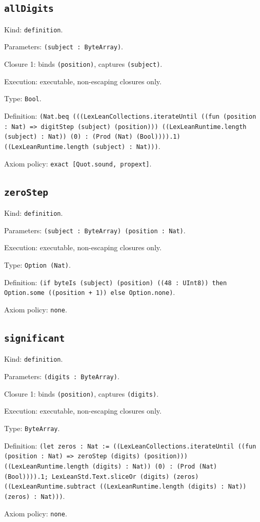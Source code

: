 \documentclass[11pt]{article}
\begin{document}
\subsection*{\texttt{allDigits}}
\noindent Kind: \texttt{definition}.\par
\noindent Parameters: \texttt{(subject : ByteArray)}.\par
\noindent Closure 1: binds \texttt{(position)}, captures \texttt{(subject)}.\par
\noindent Execution: executable, non-escaping closures only.\par
\noindent Type: \texttt{Bool}.\par
\noindent Definition: \texttt{(Nat.beq (((LexLeanCollections.iterateUntil ((fun (position : Nat) => digitStep (subject) (position))) ((LexLeanRuntime.length (subject) : Nat)) (0) : (Prod (Nat) (Bool)))).1) ((LexLeanRuntime.length (subject) : Nat)))}.\par
\noindent Axiom policy: \texttt{exact [Quot.sound, propext]}.\par
\subsection*{\texttt{zeroStep}}
\noindent Kind: \texttt{definition}.\par
\noindent Parameters: \texttt{(subject : ByteArray) (position : Nat)}.\par
\noindent Execution: executable, non-escaping closures only.\par
\noindent Type: \texttt{Option (Nat)}.\par
\noindent Definition: \texttt{(if byteIs (subject) (position) ((48 : UInt8)) then Option.some ((position + 1)) else Option.none)}.\par
\noindent Axiom policy: \texttt{none}.\par
\subsection*{\texttt{significant}}
\noindent Kind: \texttt{definition}.\par
\noindent Parameters: \texttt{(digits : ByteArray)}.\par
\noindent Closure 1: binds \texttt{(position)}, captures \texttt{(digits)}.\par
\noindent Execution: executable, non-escaping closures only.\par
\noindent Type: \texttt{ByteArray}.\par
\noindent Definition: \texttt{(let zeros : Nat := ((LexLeanCollections.iterateUntil ((fun (position : Nat) => zeroStep (digits) (position))) ((LexLeanRuntime.length (digits) : Nat)) (0) : (Prod (Nat) (Bool)))).1; LexLeanStd.Text.sliceOr (digits) (zeros) ((LexLeanRuntime.subtract ((LexLeanRuntime.length (digits) : Nat)) (zeros) : Nat)))}.\par
\noindent Axiom policy: \texttt{none}.\par
\end{document}
